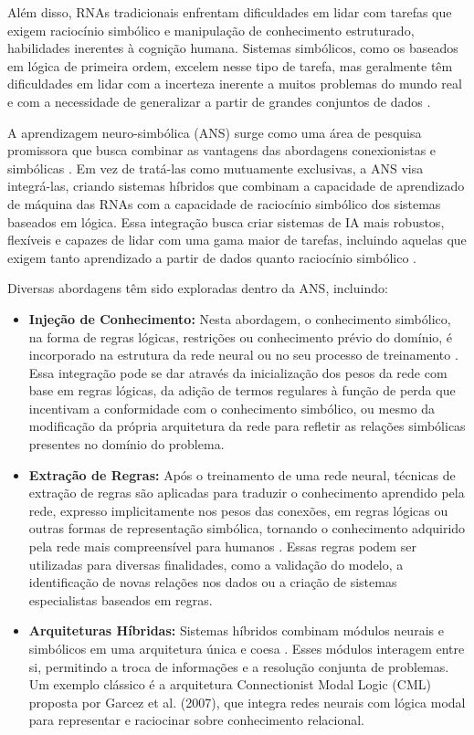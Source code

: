 \documentclass[12pt]{article}
\begin{document}
Além disso,  RNAs tradicionais enfrentam dificuldades em lidar com tarefas que exigem raciocínio simbólico e manipulação de conhecimento estruturado,  habilidades inerentes à cognição humana.  Sistemas simbólicos,  como os baseados em lógica de primeira ordem,  excelem nesse tipo de tarefa,  mas geralmente têm dificuldades em lidar com a incerteza inerente a muitos problemas do mundo real e com a necessidade de generalizar a partir de grandes conjuntos de dados \cite{besold2017neural}.

A aprendizagem neuro-simbólica (ANS) surge como uma área de pesquisa promissora que busca combinar as vantagens das abordagens conexionistas e simbólicas \cite{garcez2002neural}.  Em vez de tratá-las como mutuamente exclusivas,  a ANS visa integrá-las,  criando sistemas híbridos que combinam a capacidade de aprendizado de máquina das RNAs com a capacidade de raciocínio simbólico dos sistemas baseados em lógica.  Essa integração busca criar sistemas de IA mais robustos,  flexíveis e capazes de lidar com uma gama maior de tarefas,  incluindo aquelas que exigem tanto aprendizado a partir de dados quanto raciocínio simbólico \cite{bottou2017geometric}.

Diversas abordagens têm sido exploradas dentro da ANS,  incluindo:

\begin{itemize}
\item \textbf{Injeção de Conhecimento:} Nesta abordagem,  o conhecimento simbólico,  na forma de regras lógicas,  restrições ou conhecimento prévio do domínio,  é incorporado na estrutura da rede neural ou no seu processo de treinamento  \cite{hu2018harnessing}.   Essa integração pode se dar através da inicialização dos pesos da rede com base em regras lógicas,  da adição de termos regulares à função de perda que incentivam a conformidade com o conhecimento simbólico,  ou mesmo da modificação da própria arquitetura da rede para refletir as relações simbólicas presentes no domínio do problema.
\item \textbf{Extração de Regras:}  Após o treinamento de uma rede neural,  técnicas de extração de regras são aplicadas para traduzir o conhecimento aprendido pela rede,  expresso implicitamente nos pesos das conexões,  em regras lógicas ou outras formas de representação simbólica,  tornando o conhecimento adquirido pela rede mais compreensível para humanos \cite{haykin2009neural}. Essas regras podem ser utilizadas para diversas finalidades,  como  a validação do modelo,  a identificação de novas relações nos dados ou a criação de sistemas especialistas baseados em regras.
\item \textbf{Arquiteturas Híbridas:} Sistemas híbridos combinam módulos neurais e simbólicos em uma arquitetura única e coesa \cite{serafini2016logic}. Esses módulos interagem entre si,  permitindo a troca de informações e a resolução conjunta de problemas. Um exemplo clássico é a arquitetura Connectionist Modal Logic (CML) proposta por Garcez et al. (2007),  que integra redes neurais com lógica modal para representar e raciocinar sobre conhecimento relacional. 
\end{itemize}
\end{document}

